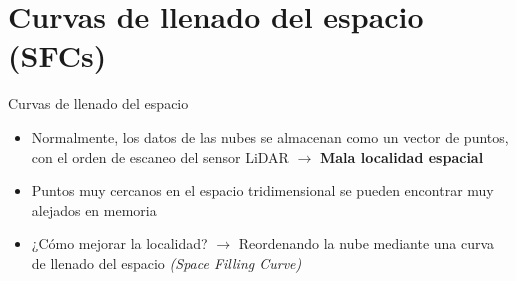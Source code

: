 \documentclass[aspectratio=169]{beamer}
\begin{document}
\section{Curvas de llenado del espacio (SFCs)}
\begin{frame}{Curvas de llenado del espacio}
    \begin{itemize}
        \item Normalmente, los datos de las nubes se almacenan como un vector de puntos, con el orden de escaneo del sensor LiDAR $\rightarrow$ \textbf{Mala localidad espacial} 
        \item Puntos muy cercanos en el espacio tridimensional se pueden encontrar muy alejados en memoria
        \item ¿Cómo mejorar la localidad? $\rightarrow$ Reordenando la nube mediante una curva de llenado del espacio \textit{(Space Filling Curve)} \cite{asano1997space}
    \end{itemize}
\end{frame}
\end{document}

